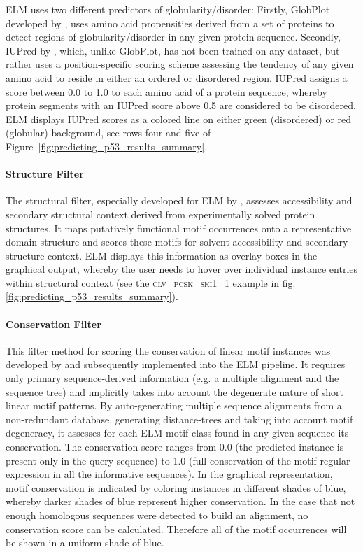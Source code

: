 \documentclass[12pt]{article}
\newcommand\motif[1]{%
    \textsc{\lowercase{#1}}%
}
\begin{document}
ELM uses two different predictors of globularity/disorder: Firstly, GlobPlot
developed by \cite{12824398}, uses amino acid propensities derived from a set of
proteins to detect regions of globularity/disorder in any given protein
sequence. Secondly, IUPred by \cite{15955779}, which, unlike GlobPlot, has not
been trained on any dataset, but rather uses a position-specific scoring scheme
assessing the tendency of any given amino acid to reside in either an ordered
or disordered region. IUPred assigns a score between 0.0 to 1.0 to each amino
acid of a protein sequence, whereby protein segments with an IUPred score above
0.5 are considered to be disordered. ELM displays IUPred scores as a colored
line on either green (disordered) or red (globular) background, see rows four
and five of Figure~\ref{fig:predicting_p53_results_summary}.

\paragraph*{Structure Filter}\label{StructureFilter}

The structural filter, especially developed for ELM by \cite{19852836},
assesses accessibility and secondary structural context derived from
experimentally solved protein structures. It maps putatively functional motif
occurrences onto a representative domain structure and scores these motifs for
solvent-accessibility and secondary structure context. ELM displays this
information as overlay boxes in the graphical output, whereby the user needs to
hover over individual instance entries within structural context (see the
\motif{CLV\_PCSK\_SKI1\_1} example in fig.
\ref{fig:predicting_p53_results_summary}).

\paragraph*{Conservation Filter}\label{ConservationFilter}

This filter method for scoring the conservation of linear motif instances was
developed by \cite{18460207} and subsequently implemented into the ELM
pipeline. It requires only primary sequence-derived information (e.g. a
multiple alignment and the sequence tree) and implicitly takes into account the
degenerate nature of short linear motif patterns. By auto-generating multiple
sequence alignments from a non-redundant database, generating distance-trees
and taking into account motif degeneracy, it assesses for each ELM motif class
found in any given sequence its conservation. The conservation score ranges
from 0.0 (the predicted instance is present only in the query sequence) to 1.0
(full conservation of the motif regular expression in all the informative
sequences).
In the graphical representation, motif conservation is indicated by coloring
instances in different shades of blue, whereby darker shades of blue represent
higher conservation.
In the case that not enough homologous sequences were detected to build an
alignment, no conservation score can be calculated. Therefore all of the motif
occurrences will be shown in a uniform shade of blue.
\end{document}
